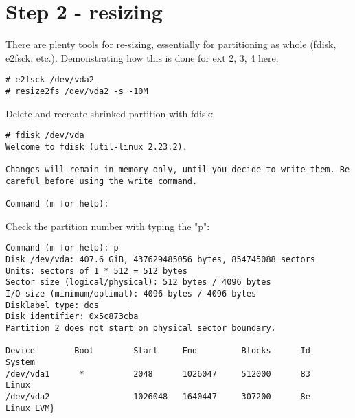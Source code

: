 \section{Step 2 - resizing}
There are plenty tools for re-sizing, essentially for partitioning as whole (fdisk, e2fsck, etc.).
Demonstrating how this is done for ext 2, 3, 4 here:
\begin{lstlisting}[columns=fixed,basicstyle=\ttfamily\footnotesize,tabsize=4,backgroundcolor=\color{yellow!10}]
# e2fsck /dev/vda2
# resize2fs /dev/vda2 -s -10M
\end{lstlisting}
Delete and recreate shrinked partition with fdisk:
\begin{lstlisting}[columns=fixed,basicstyle=\ttfamily\footnotesize,tabsize=4,backgroundcolor=\color{yellow!10}]
# fdisk /dev/vda
Welcome to fdisk (util-linux 2.23.2).

Changes will remain in memory only, until you decide to write them. Be careful before using the write command.

Command (m for help):
\end{lstlisting}
Check the partition number with typing the "p":
\begin{lstlisting}[columns=fixed,basicstyle=\ttfamily\footnotesize,tabsize=4,backgroundcolor=\color{yellow!10}]
Command (m for help): p
Disk /dev/vda: 407.6 GiB, 437629485056 bytes, 854745088 sectors
Units: sectors of 1 * 512 = 512 bytes
Sector size (logical/physical): 512 bytes / 4096 bytes
I/O size (minimum/optimal): 4096 bytes / 4096 bytes
Disklabel type: dos
Disk identifier: 0x5c873cba
Partition 2 does not start on physical sector boundary.

Device        Boot        Start     End         Blocks      Id    System
/dev/vda1      *          2048      1026047     512000      83    Linux
/dev/vda2                 1026048   1640447     307200      8e    Linux LVM}
\end{lstlisting}



